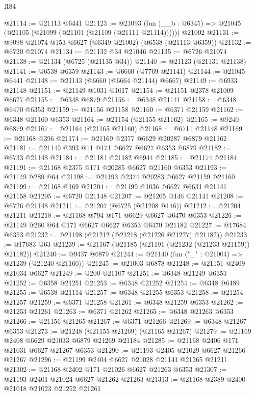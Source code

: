 \begin{lexlean}{R84}
\begin{coremodule}
@21114 := @21113 @6441
@21123 := @21093
    (fun (__b : @6345) => @21045 (@21105 (@21099 (@21101 (@21109 (@21111 @21114))))))
    @21002
@21131 := @9098 @21074 @153 @6627 (@6349 @21002) (@6538 (@21113 @6359))
@21132 := @6720 @21074
@21134 := @21132 @34 @21046
@21135 := @6726 @21074
@21138 := @21134 (@6725 (@21135 @34))
@21140 := @21123 (@21131 @21138)
@21141 := @6538 @6359
@21143 := @6660 (@7769 @21141)
@21144 := @21045 @6441
@21148 := @21143 (@6660 (@6664 @21144) @6667)
@21149 := @6933 @21148
@21151 := @21149 @1031 @1017
@21154 := @21151 @2378 @21009 @6627
@21155 := @6348 @6879
@21156 := @6348 @21141
@21158 := @6348 @6470 @6353
@21159 := @21156 @21158
@21160 := @6371 @21159
@21162 := @6348 @21160 @6353
@21164 := @21154 (@21155 @21162)
@21165 := @9240 @6879
@21167 := @21164 (@21165 @21160)
@21168 := @6711 @21148
@21169 := @21168 @396
@21174 := @21169 @2377 @6629 @20287 @6879 @21162
@21181 := @21149 @393 @11 @171 @6627 @6627 @6353 @6879
@21182 := @6733 @21148
@21184 := @21181 @21182 @6944
@21185 := @21174 @21184
@21191 := @21168 @2375 @171 @20285 @6627 @21160 @6353
@21193 := @21149 @289 @64
@21198 := @21193 @2374 @20283 @6627 @21159 @21160
@21199 := @21168 @169
@21204 := @21199 @1036 @6627 @6631 @21141 @21158
@21205 := @6720 @21148
@21207 := @21205 @146 @21141
@21208 := @6726 @21148
@21211 := @21207 (@6725 (@21208 @146))
@21212 := @21204 @21211
@21218 := @21168 @794 @171 @6629 @6627 @6470 @6353
@21226 := @21149 @260 @64 @171 @6627 @6627 @6353 @6470 @21182
@21227 := @17684 @6353
@21232 := @21198 (@21212 (@21218 (@21226 @21227) @21182))
@21233 := @17683 @63
@21239 := @21167 (@21185 (@21191 (@21232 (@21233 @21159)) @21182))
@21240 := @9437 @6879
@21244 := @21140 (fun ("_" : @21004) => @21239 (@21240 @21160))
@21245 := @21003 @6878
@21248 := @21151 @2409 @21034 @6627
@21249 := @200 @21107
@21251 := @6348 @21249 @6353
@21252 := @6358 @21251
@21253 := @6348 @21252
@21254 := @6348 @6489
@21255 := @6538 @21114
@21257 := @6348 @21255 @6353
@21258 := @21254 @21257
@21259 := @6371 @21258
@21261 := @6348 @21259 @6353
@21262 := @21253 @21261
@21263 := @6371 @21262
@21265 := @6348 @21263 @6353
@21266 := @21156 @21265
@21267 := @6371 @21266
@21269 := @6348 @21267 @6353
@21273 := @21248 (@21155 @21269) (@21165 @21267)
@21279 := @21169 @2408 @6629 @21033 @6879 @21269 @21184
@21285 := @21168 @2406 @171 @21031 @6627 @21267 @6353
@21290 := @21193 @2405 @21029 @6627 @21266 @21267
@21296 := @21199 @2404 @6627 @21028 @21141 @21265 @21211
@21302 := @21168 @2402 @171 @21026 @6627 @21263 @6353
@21307 := @21193 @2401 @21024 @6627 @21262 @21263
@21313 := @21168 @2389 @2400 @21018 @21023 @21252 @21261

\end{coremodule}
\end{lexlean}
